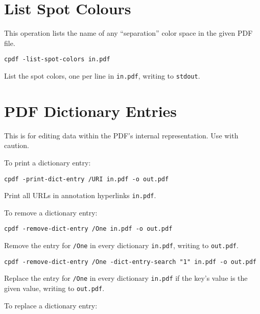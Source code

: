 \documentclass{book}
\begin{document}
\section{List Spot Colours}
This operation lists the name of any ``separation'' color space in the given PDF file.

  \begin{framed}
  \small\noindent\verb!cpdf -list-spot-colors in.pdf!

  \vspace{2.5mm}
  \noindent List the spot colors, one per line in \texttt{in.pdf}, writing to \texttt{stdout}.
  \end{framed}

\section{PDF Dictionary Entries}
\label{removedictentry}
This is for editing data within the PDF's internal representation. Use with caution.

To print a dictionary entry:

  \begin{framed}
  \small\noindent\verb!cpdf -print-dict-entry /URI in.pdf -o out.pdf!

  \vspace{2.5mm}
  \noindent Print all URLs in annotation hyperlinks \texttt{in.pdf}. 
  \end{framed}

To remove a dictionary entry:

  \begin{framed}
  \small\noindent\verb!cpdf -remove-dict-entry /One in.pdf -o out.pdf!

  \vspace{2.5mm}
  \noindent Remove the entry for \texttt{/One} in every dictionary \texttt{in.pdf}, writing to \texttt{out.pdf}. 

  \vspace{2.5mm}

  \small\noindent\verb!cpdf -remove-dict-entry /One -dict-entry-search "1" in.pdf -o out.pdf!

  \vspace{2.5mm}
  \noindent Replace the entry for \texttt{/One} in every dictionary \texttt{in.pdf} if the key's value is the given value, writing to \texttt{out.pdf}. 
  \end{framed}

To replace a dictionary entry:
\end{document}
